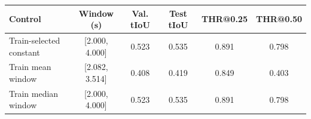 \begin{tabular}{lccccc}
\toprule
Control & Window (s) & Val. tIoU & Test tIoU & THR@0.25 & THR@0.50 \\
\midrule
Train-selected constant & [2.000, 4.000] & 0.523 & 0.535 & 0.891 & 0.798 \\
Train mean window & [2.082, 3.514] & 0.408 & 0.419 & 0.849 & 0.403 \\
Train median window & [2.000, 4.000] & 0.523 & 0.535 & 0.891 & 0.798 \\
\bottomrule
\end{tabular}
